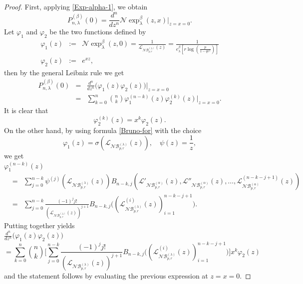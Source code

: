 \documentclass{birkjour}
\theoremstyle{definition}
\theoremstyle{remark}
\numberwithin{equation}{section}
\begin{document}
\begin{proof}
First, applying \eqref{Exp-alpha-1}, we obtain
$$P^{(\beta)}_{n, \lambda}(0)=\displaystyle{\frac{d^{n}}{dz^{n}}\mathcal{N}\!\exp^{\beta}_{\lambda}(z, x)\big|_{z=x=0}}.$$
Let $\varphi_{1}$ and $\varphi_{2}$ be the two functions defined by
$$\begin{array}{lll}
\varphi_{1}(z)&:=&\mathcal{N}\!\exp^{\beta}_{\lambda}(z,
0)=\displaystyle{\frac{1}{\mathcal{L}_{\mathcal{NB}^{(\lambda)}_{p,
r}}(z)}=
\frac{1}{e^{\beta}_{\lambda}[r\log(\frac{p}{1-qe^{z}})]}}\\
\varphi_{2}(z)&:=&e^{xz},
\end{array}$$
then by the general Leibniz rule we get
$$\begin{array}{lll}
P^{(\beta)}_{n, \lambda}(0)&=&\displaystyle{\frac{d^{n}}{dz^{n}}\big(\varphi_{1}(z)\varphi_{2}(z)\big)|_{z=x=0}}\\
&=&\displaystyle{\sum^{n}_{k=0}
\binom{n}{k}\varphi^{(n-k)}_{1}(z)\varphi^{(k)}_{2}(z)|_{z=x=0}}.
\end{array}$$
It is clear that
$$\varphi^{(k)}_{2}(z)=x^{k}\varphi_{2}(z).$$
On the other hand, by using formula \eqref{Bruno-for} with the
choice
$$\varphi_{1}(z)=\sigma(\mathcal{L}_{\mathcal{NB}^{(\lambda)}_{p, r}}(z)),\quad \psi(z)=\frac{1}{z},$$
we get\\

$\varphi^{(n-k)}_{1}(z)$
$$\begin{array}{lll}
&=&\displaystyle{\sum^{n-k}_{j=0}\psi^{(j)}(\mathcal{L}_{\mathcal{NB}^{(\lambda)}_{p,
r}}(z))B_{n-k, j}(\mathcal{L}'_{\mathcal{NB}^{(\alpha)}_{p, r}}(z),
\mathcal{L}''_{\mathcal{NB}^{(\alpha)}_{p, r}}(z), \ldots,
\mathcal{L}^{(n-k-j+1)}_{\mathcal{NB}^{(\alpha)}_{p, r}}(z))}\\
&=&\displaystyle{\sum^{n-k}_{j=0}\frac{(-1)^{j}j!}{(\mathcal{L}_{\mathcal{NB}^{(\lambda)}_{p,
r}}(z))^{j+1}}B_{n-k,
j}\big((\mathcal{L}^{(i)}_{\mathcal{NB}^{(\lambda)}_{p,
r}}(z))^{n-k-j+1}_{i=1}\big)}.
\end{array}$$
Putting together yields\\

$\displaystyle{\frac{d^{n}}{dz^{n}}\big(\varphi_{1}(z)\varphi_{2}(z)\big)}$
$$\displaystyle{=
\sum^{n}_{k=0}\binom{n}{k}\Big[\sum^{n-k}_{j=0}\frac{(-1)^{j}j!}{(\mathcal{L}_{\mathcal{NB}^{(\lambda)}_{p,
r}}(z))^{j+1}} B_{n-k,
j}\big((\mathcal{L}^{(i)}_{\mathcal{NB}^{(\lambda)}_{p,
r}}(z))^{n-k-j+1}_{i=1}\big) \Big]x^{k}\varphi_{2}(z)}
$$
and the statement follows by evaluating the previous expression at
$z=x=0$.
\end{proof}
\end{document}
